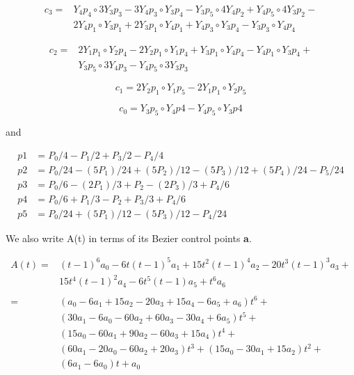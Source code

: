 \documentclass{article}
\begin{document}
 \begin{equation}
 \begin{aligned}
    c_3 =& Y_4 p_4\circ 3 Y_3 p_3 - 3 Y_4 p_3\circ Y_3 p_4 - 
          Y_3 p_5\circ 4 Y_4 p_2 + Y_4 p_5\circ 4 Y_3 p_2 - \\
          & 2 Y_4 p_1\circ Y_3 p_1 + 2 Y_3 p_1\circ Y_4 p_1 + 
          Y_4 p_3\circ Y_3 p_4 - Y_3 p_3\circ Y_4 p_4
 \end{aligned}
 \end{equation}
 
 \begin{equation}
 \begin{aligned}
    c_2 =& 2 Y_1 p_1\circ Y_2 p_4 - 2 Y_2 p_1\circ Y_1 p_4 + 
          Y_3 p_1\circ Y_4 p_4 - Y_4 p_1\circ Y_3 p_4 + \\
          & Y_3 p_5\circ 3 Y_4 p_3 - Y_4 p_5\circ 3 Y_3 p_3
 \end{aligned}
 \end{equation}
 
 \begin{equation}
    c_1 = 2 Y_2 p_1\circ Y_1 p_5 - 2 Y_1 p_1\circ Y_2 p_5
 \end{equation}
 
 \begin{equation}
c_0 = Y_3 p_5 \circ Y_4 p4 - Y_4 p_5 \circ Y_3 p4
 \end{equation}
 
 and
 
\begin{equation}
\begin{aligned}
p1 &= P_0/4  - P_1/2      + P_3/2      - P_4/4 \\
p2 &= P_0/24 - (5P_1)/24 + (5P_2)/12 - (5P_3)/12 + (5P_4)/24 - P_5/24 \\
p3 &= P_0/6  - (2P_1)/3  + P_2        - (2P_3)/3  + P_4/6 \\
p4 &= P_0/6  + P_1/3      - P_2        + P_3/3      + P_4/6 \\
p5 &= P_0/24 + (5P_1)/12 - (5P_3)/12 - P_4/24
\end{aligned}
\end{equation}

 We also write A(t) in terms of its Bezier control points \textbf{a}.
 
\begin{equation} 
\begin{aligned}
A(t) =& (t - 1)^6 a_0  - 6t(t - 1)^5a_1 + 15t^2(t - 1)^4 a_2 - 20 t^3 (t - 1)^3 a_3 + \\
& 15 t^4 (t - 1)^2 a_4 - 6 t^5 (t - 1) a_5 + t^6 a_6
 \\\\
=& (a_0 - 6a_1 + 15a_2 - 20a_3 + 15a_4 - 6a_5 + a_6)t^6 + \\ &(30a_1 - 6a_0 - 60a_2 + 60a_3 - 30a_4 + 6a_5)t^5 + \\ & (15a_0 - 60a_1 + 90a_2 - 60a_3 + 15a_4)t^4 + \\
& (60a_1 - 20a_0 - 60a_2 + 20a_3)t^3 + (15a_0 - 30a_1 + 15a_2)t^2 + \\
&(6a_1 - 6a_0)t + a_0

\end{aligned}
\end{equation}
\end{document}
